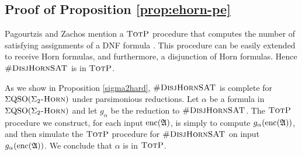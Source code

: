 \subsection*{Proof of Proposition \ref{prop:ehorn-pe}}
Pagourtzis and Zachos mention a $\text{\sc TotP}$ procedure that computes the number of satisfying assignments of a DNF formula \cite{PagourtzisZ06}. This procedure can be easily extended to receive Horn formulas, and furthermore, a disjunction of Horn formulas. Hence $\textsc{\#DisjHornSAT}$ is in $\text{\sc TotP}$.

As we show in Proposition \ref{sigma2hard}, $\textsc{\#DisjHornSAT}$ is complete for $\Sigma{\rm QSO}(\Sigma_2\textsc{-Horn})$ under parsimonious reductions. Let $\alpha$ be a formula in $\Sigma{\rm QSO}(\Sigma_2\textsc{-Horn})$ and let $g_{\alpha}$ be the reduction to $\textsc{\#DisjHornSAT}$. The $\text{\sc TotP}$ procedure we construct, for each input ${\rm enc}(\mathfrak{A})$, is simply to compute $g_{\alpha}({\rm enc}(\mathfrak{A}))$, and then simulate the $\text{\sc TotP}$ procedure for $\textsc{\#DisjHornSAT}$ on input $g_{\alpha}({\rm enc}(\mathfrak{A}))$. We conclude that $\alpha$ is in $\text{\sc TotP}$.










